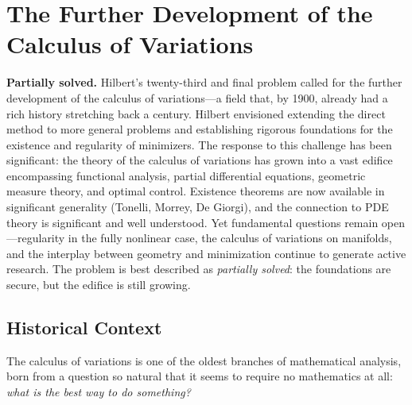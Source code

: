 
\chapter[Calculus of Variations]{The Further Development of the Calculus of Variations}

\begin{partiallybox}
\textbf{Partially solved.} Hilbert's twenty-third and final problem called for the further development of the calculus of variations---a field that, by 1900, already had a rich history stretching back a century. Hilbert envisioned extending the direct method to more general problems and establishing rigorous foundations for the existence and regularity of minimizers. The response to this challenge has been significant: the theory of the calculus of variations has grown into a vast edifice encompassing functional analysis, partial differential equations, geometric measure theory, and optimal control. Existence theorems are now available in significant generality (Tonelli, Morrey, De Giorgi), and the connection to PDE theory is significant and well understood. Yet fundamental questions remain open---regularity in the fully nonlinear case, the calculus of variations on manifolds, and the interplay between geometry and minimization continue to generate active research. The problem is best described as \emph{partially solved}: the foundations are secure, but the edifice is still growing.
\end{partiallybox}

\section{Historical Context}

The calculus of variations is one of the oldest branches of mathematical analysis, born from a question so natural that it seems to require no mathematics at all: \emph{what is the best way to do something?}

